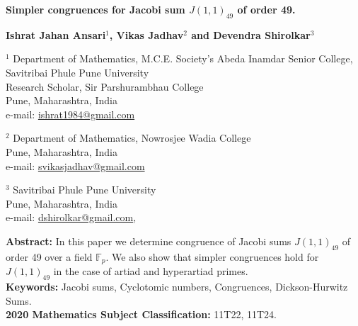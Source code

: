 \documentclass[a4paper,12pt]{article}
\def\F{{\mathbb F}}
\begin{document}
\setcounter{page}{1}

\thispagestyle{empty} 

\begin{center}
{\LARGE \bf  Simpler congruences for Jacobi sum $J(1,1)_{49}$ of order 49.\\[4mm] } %
\vspace{8mm}

{\Large \bf Ishrat Jahan Ansari$^1$, Vikas Jadhav$^2$ and Devendra Shirolkar$^3$}
\vspace{3mm}

$^1$ Department of Mathematics, M.C.E. Society's Abeda Inamdar Senior College,\\ Savitribai Phule Pune University\\ 
Research Scholar, Sir Parshurambhau College\\
Pune, Maharashtra, India \\
e-mail: \url{ishrat1984@gmail.com}
\vspace{2mm}

$^2$ Department of Mathematics, Nowrosjee Wadia College\\ 
Pune, Maharashtra, India \\
e-mail: \url{svikasjadhav@gmail.com}
\vspace{2mm}

$^3$ Savitribai Phule Pune University\\
Pune, Maharashtra, India \\
e-mail: \url{dshirolkar@gmail.com},   %
\end{center}

{\bf Abstract:} In this paper we determine congruence of Jacobi sums $J(1,1)_{49}$ of order 49 over a field $\F_{p}$. 
We also show that simpler congruences hold for $J(1,1)_{49}$ in the case of artiad and hyperartiad primes.  \\
{\bf Keywords:} Jacobi sums, Cyclotomic numbers, Congruences, Dickson-Hurwitz Sums.  \\ %
{\bf 2020 Mathematics Subject Classification:} 11T22, 11T24. %
\vspace{5mm}
\end{document}
